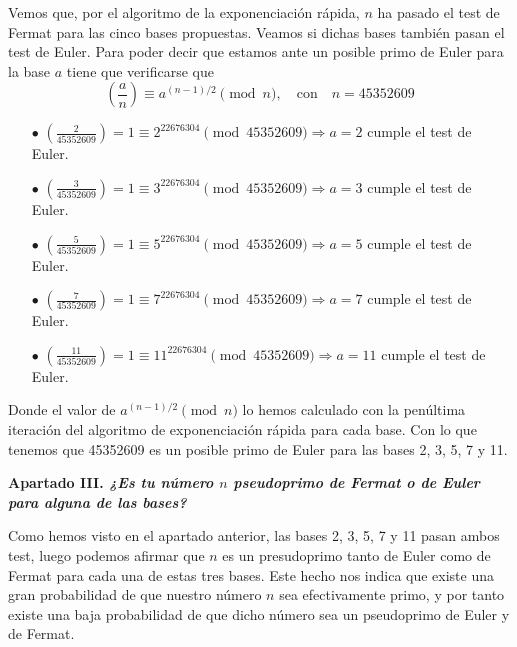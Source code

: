 \documentclass[fleqn]{article}
\begin{document}
    Vemos que, por el algoritmo de la exponenciación rápida, $n$ ha pasado el test de Fermat para las cinco bases propuestas. 
    Veamos si dichas bases también pasan el test de Euler. Para poder decir que estamos ante un posible primo de Euler 
    para la base $a$ tiene que verificarse que 
    $$\left(\frac{a}{n} \right) \equiv a^{(n-1)/2} \pmod{n}, \quad \text{con} \quad n=45352609$$
    
    \begin{enumerate}
        \item[$\bullet$] $ \left(\frac{2}{45352609}\right) = 1 \equiv 2^{22676304} \pmod{45352609} \Rightarrow a = 2$ cumple el test de Euler. 
        \item[$\bullet$] $ \left(\frac{3}{45352609}\right) = 1 \equiv 3^{22676304} \pmod{45352609} \Rightarrow a = 3$ cumple el test de Euler. 
        \item[$\bullet$] $ \left(\frac{5}{45352609}\right) = 1 \equiv 5^{22676304} \pmod{45352609} \Rightarrow a = 5$ cumple el test de Euler. 
        \item[$\bullet$] $ \left(\frac{7}{45352609}\right) = 1 \equiv 7^{22676304} \pmod{45352609} \Rightarrow a = 7$ cumple el test de Euler.
        \item[$\bullet$] $ \left(\frac{11}{45352609}\right) = 1 \equiv 11^{22676304} \pmod{45352609} \Rightarrow a = 11$ cumple el test de Euler.
    \end{enumerate}

    Donde el valor de $a^{(n-1)/2} \pmod{n}$ lo hemos calculado con la penúltima iteración del algoritmo de exponenciación rápida para cada base.
    Con lo que tenemos que 45352609 es un posible primo de Euler para las bases 2, 3, 5, 7 y 11.


    \newpage
    \textbf{Apartado III. \textit{¿Es tu número $n$ pseudoprimo de Fermat o de Euler para alguna de las bases?}}

    Como hemos visto en el apartado anterior, las bases 2, 3, 5, 7 y 11 pasan ambos test, luego podemos afirmar que $n$ es un presudoprimo
    tanto de Euler como de Fermat para cada una de estas tres bases. Este hecho nos indica que existe una gran probabilidad de que nuestro número
    $n$ sea efectivamente primo, y por tanto existe una baja probabilidad de que dicho número sea un pseudoprimo de Euler y de Fermat.
\end{document}
